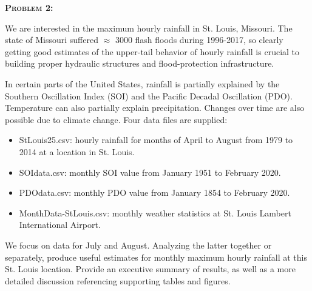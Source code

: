 \documentclass[12pt,oneside]{article}
\newenvironment{problem}[1]
{\begin{mdframed}
        \textbf{\textsc{Problem #1:}}
}
{\end{mdframed}}
\begin{document}
\begin{problem}{2}
We are interested in the maximum hourly rainfall in St. Louis, Missouri. The state of
Missouri suffered $\approx$ 3000 flash floods during 1996-2017, so clearly getting good estimates of the upper-tail behavior of hourly rainfall is crucial to building proper hydraulic structures and flood-protection infrastructure. 

\noindent In certain parts of the United States, rainfall is partially explained by the Southern Oscillation Index (SOI) and the Pacific Decadal Oscillation (PDO). Temperature can also partially explain precipitation. Changes over time are also possible due to climate change. Four data
files are supplied:
\begin{itemize}
    \item StLouis25.csv: hourly rainfall for months of April to August from 1979 to 2014 at a
location in St. Louis.
    \item SOIdata.csv: monthly SOI value from January 1951 to February 2020.
    \item PDOdata.csv: monthly PDO value from January 1854 to February 2020.
    \item MonthData-StLouis.csv: monthly weather statistics at St. Louis Lambert International Airport.
\end{itemize}
We focus on data for July and August. Analyzing the latter together or separately, produce useful estimates for monthly maximum hourly rainfall at this St. Louis location. Provide an executive summary of results, as well as a more detailed discussion referencing supporting
tables and figures.
\end{problem}
\end{document}
